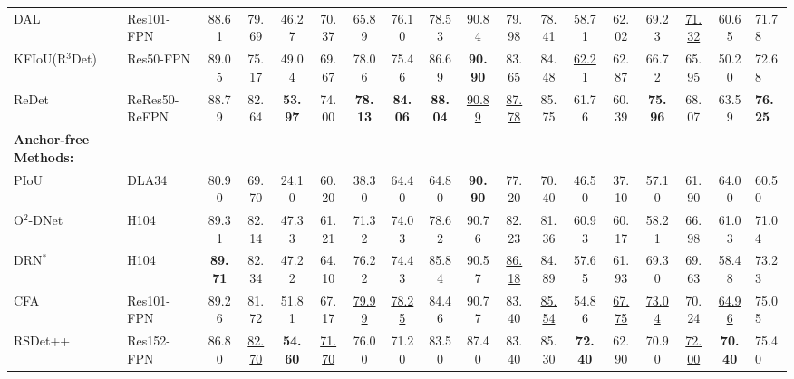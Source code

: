 \begin{center}
{\begin{tabular}{llccccccccccccccc|g}
DAL\citep{ming2021dynamic}                  & Res101-FPN    & 88.61     & 79.69     & 46.27     & 70.37     & 65.89     & 76.10     & 78.53     & 90.84     & 79.98     & 78.41     & 58.71     & 62.02     & 69.23     & {\underline{71.32}}     & 60.65     & 71.78 \\
KFIoU(R$^3$Det)\citep{yang2022kfiou}        & Res50-FPN     & 89.05     & 75.17     & 49.04     & 69.67     & 78.06     & 75.46     & 86.69     & {\textbf{90.90}}     & 83.65     & 84.48     & \underline{62.21}     & 62.87     & 66.72     & 65.95     & 50.20     & 72.68 \\
ReDet\citep{han2021ReDet}                   & ReRes50-ReFPN & 88.79     & 82.64     & {\textbf{53.97}}     & 74.00     & {\textbf{78.13}}     & {\textbf{84.06}}     & {\textbf{88.04}}     & {\underline{90.89}}     & {\underline{87.78}}     & 85.75     & 61.76     & 60.39     & {\textbf{75.96}}     & 68.07     & 63.59     & \textbf{76.25} \\ 
\midrule
\textbf{Anchor-free Methods:} \\
PIoU~\citep{chen2020piou}                   & DLA34         & 80.90     & 69.70     & 24.10     & 60.20     & 38.30     & 64.40     & 64.80     & {\textbf{90.90}}     & 77.20     & 70.40     & 46.50     & 37.10     & 57.10     & 61.90     & 64.00     & 60.50 \\
O$^2$-DNet\citep{wei2020o2det}              & H104          & 89.31     & 82.14     & 47.33     & 61.21     & 71.32     & 74.03     & 78.62     & 90.76     & 82.23     & 81.36     & 60.93     & 60.17     & 58.21     & 66.98     & 61.03     & 71.04 \\
DRN$^*$\citep{pan2020drn}                   & H104          & {\textbf{89.71}}     & 82.34     & 47.22     & 64.10     & 76.22     & 74.43     & 85.84     & 90.57     & {\underline{86.18}}     & 84.89     & 57.65     & 61.93     & 69.30     & 69.63     & 58.48     & 73.23 \\ 
CFA\citep{guo2021CFA}                       & Res101-FPN    & 89.26     & 81.72     & 51.81     & 67.17     & {\underline{79.99}}     & {\underline{78.25}}     & 84.46     & 90.77     & 83.40     & {\underline{85.54}}     & 54.86     & {\underline{67.75}}     & {\underline{73.04}}     & 70.24     & {\underline{64.96}}     & 75.05 \\
RSDet++\citep{qian2022rsdet++}              & Res152-FPN    & 86.80     & {\underline{82.70}}     & {\textbf{54.60}}     & {\underline{71.70}}     & 76.00     & 71.20     & 83.50     & 87.40     & 83.40     & 85.30     & {\textbf{72.40}}     & 62.90     & 70.90     & {\underline{72.00}}     & {\textbf{70.40}}     & 75.40 \\

\end{tabular}}
\end{center}
